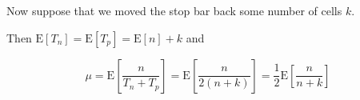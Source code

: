 \documentclass{amsart}
\begin{document}
Now suppose that we moved the stop bar back some number of cells $k$.

Then $\text{E}[T_n]=\text{E}[T_p]=\text{E}[n]+k$ and

\begin{equation*}
  \mu = \text{E}\left[\frac{n}{T_n+T_p}\right]
  = \text{E}\left[\frac{n}{2(n+k)}\right]
  = \frac{1}{2}\text{E}\left[\frac{n}{n+k}\right]
\end{equation*}
\end{document}

